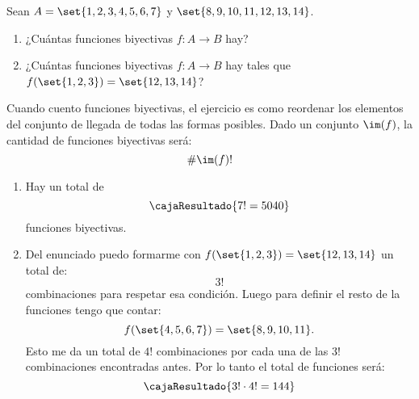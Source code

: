 \begin{enunciado}{\ejercicio}
  Sean $A = \set{1,2,3,4,5,6,7}$ y $\set{8,9,10,11,12,13,14}$.
  \begin{enumerate}[label=\roman*)]
    \item ¿Cuántas funciones biyectivas $f: A \to B$ hay?
    \item ¿Cuántas funciones biyectivas $f: A \to B$ hay tales que $f(\set{1,2,3}) = \set{12,13,14}$?
  \end{enumerate}
\end{enunciado}

Cuando cuento funciones biyectivas, el ejercicio es como reordenar los elementos del conjunto de llegada de todas las
formas posibles. Dado un conjunto $\im(f)$, la cantidad de funciones biyectivas será:
$$
  \#\im(f)!
$$

\begin{enumerate}[label=\roman*)]
  \item
        Hay un total de
        $$
          \cajaResultado{
            7! = 5040
          }
        $$
        funciones biyectivas.

  \item  Del enunciado puedo formarme con $f(\set{1,2,3}) = \set{12,13,14}$ un total de:
        $$
          3!
        $$
        combinaciones para respetar esa condición. Luego para definir el resto de la funciones tengo
        que contar:
        $$
          f(\set{4,5,6,7}) = \set{8,9,10,11}.
        $$
        Esto me da un total de $4!$ combinaciones por cada una de las $3!$ combinaciones encontradas antes.
        Por lo tanto el total de funciones será:
        $$
          \cajaResultado{
            3! \cdot 4! = 144
          }
        $$
\end{enumerate}

\begin{aportes}
  \item {}
\end{aportes}
